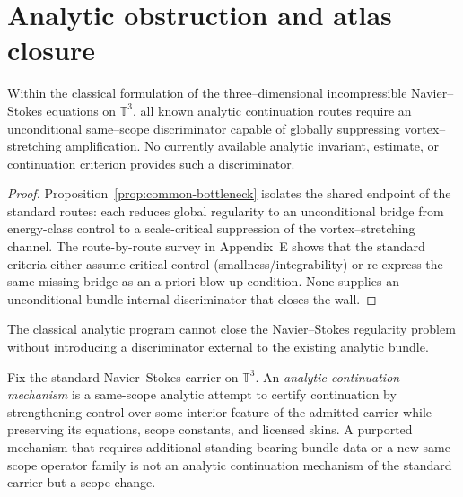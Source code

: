 \section{Analytic obstruction and atlas closure}

\begin{theorem}
\label{thm:analytic-obstruction}
Within the classical formulation of the three--dimensional incompressible Navier--Stokes equations on $\mathbb T^3$, all known analytic continuation routes require an unconditional same--scope discriminator capable of globally suppressing vortex--stretching amplification.
No currently available analytic invariant, estimate, or continuation criterion provides such a discriminator.
\end{theorem}

\begin{proof}
Proposition~\ref{prop:common-bottleneck} isolates the shared endpoint of the standard routes: each reduces global regularity to an unconditional bridge from energy-class control to a scale-critical suppression of the vortex--stretching channel.
The route-by-route survey in Appendix~E shows that the standard criteria either assume critical control (smallness/integrability) or re-express the same missing bridge as an a priori blow-up condition.
None supplies an unconditional bundle-internal discriminator that closes the wall.
\end{proof}

\begin{corollary}
\label{cor:analytic-incompleteness}
The classical analytic program cannot close the Navier--Stokes regularity problem without introducing a discriminator external to the existing analytic bundle.
\end{corollary}

\begin{definition}\label{def:analytic-mechanism}
Fix the standard Navier--Stokes carrier on $\mathbb T^3$. An \emph{analytic continuation mechanism}
is a same-scope analytic attempt to certify continuation by strengthening control over some interior
feature of the admitted carrier while preserving its equations, scope constants, and licensed skins.
A purported mechanism that requires additional standing-bearing bundle data or a new same-scope
operator family is not an analytic continuation mechanism of the standard carrier but a scope change.
\end{definition}

